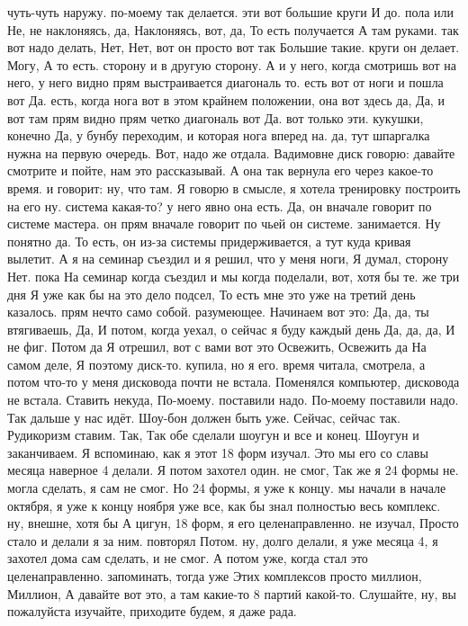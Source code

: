 чуть-чуть наружу. по-моему так делается.
эти вот большие круги И до.
пола или Не, не наклоняясь, да, Наклоняясь, вот, да, То есть получается А там руками. так вот надо делать, Нет, Нет, вот он просто вот так Большие такие.
круги он делает. Могу, А то есть.
сторону и в другую сторону.
А и у него, когда смотришь вот на него, у него видно прям выстраивается диагональ то.
есть вот от ноги и пошла вот Да.
есть, когда нога вот в этом крайнем положении, она вот здесь да, Да, и вот там прям видно прям четко диагональ вот Да.
вот только эти.
кукушки, конечно Да, у бунбу переходим, и которая нога вперед на.
да, тут шпаргалка нужна на первую очередь.
Вот, надо же отдала.
Вадимовне диск говорю: давайте смотрите и пойте, нам это рассказывай. А она так вернула его через какое-то время.
и говорит: ну, что там.
Я говорю в смысле, я хотела тренировку построить на его ну.
система какая-то? у него явно она есть. Да, он вначале говорит по системе мастера. он прям вначале говорит по чьей он системе.
занимается. Ну понятно да. То есть, он из-за системы придерживается, а тут куда кривая вылетит.
А я на семинар съездил и я решил, что у меня ноги, Я думал, сторону Нет. пока На семинар когда съездил и мы когда поделали, вот,
хотя бы те.
же три дня Я уже как бы на это дело подсел, То есть мне это уже на третий день казалось.
прям нечто само собой.
разумеющее. Начинаем вот это: Да, да, ты втягиваешь, Да, И потом, когда уехал,
о сейчас я буду каждый день Да, да, да, И не фиг. Потом да Я отрешил, вот с вами вот это Освежить, Освежить да На самом деле, Я поэтому диск-то.
купила, но я его.
время читала, смотрела, а потом что-то у меня дисковода почти не встала. Поменялся компьютер, дисковода не встала.
Ставить некуда, По-моему.
поставили надо.
По-моему поставили надо.
Так дальше у нас идёт.
Шоу-бон должен быть уже.
Сейчас, сейчас так.
Рудикоризм ставим.
Так, Так обе сделали шоугун и все и конец.
Шоугун и заканчиваем.
Я вспоминаю, как я этот 18 форм изучал.
Это мы его со славы месяца наверное 4 делали.
Я потом захотел один.
не смог, Так же я 24 формы не.
могла сделать, я сам не смог.
Но 24 формы, я уже к концу. мы начали в начале октября, я уже к концу ноября уже все, как бы знал полностью весь комплекс. ну, внешне, хотя бы А цигун, 18 форм, я его целенаправленно.
не изучал, Просто стало и делали я за ним.
повторял Потом. ну, долго делали, я уже месяца 4, я захотел дома сам сделать, и не смог. А потом уже, когда стал это целенаправленно.
запоминать, тогда уже Этих комплексов просто миллион, Миллион, А давайте вот это, а там какие-то 8 партий какой-то. Слушайте, ну, вы пожалуйста изучайте, приходите будем, я даже рада.
